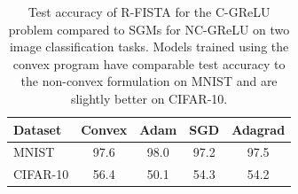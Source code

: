 \begin{table}
	\centering
	\caption{Test accuracy of R-FISTA for the C-GReLU problem compared to SGMs for NC-GReLU on two image classification tasks.
		Models trained using the convex program have comparable test accuracy to the non-convex formulation on MNIST and are slightly better on CIFAR-10.
	}%
	\label{table:image-datasets}%
	\vspace{0.1in}
	\begin{small}
		\begin{tabular}{lcccc} \toprule
			\textbf{Dataset} & \textbf{Convex} & \textbf{Adam} & \textbf{SGD} & \textbf{Adagrad} \\ \midrule
			MNIST            & 97.6            & 98.0          & 97.2         & 97.5             \\
			CIFAR-10         & 56.4            & 50.1          & 54.3         & 54.2             \\\bottomrule
		\end{tabular}
	\end{small}
\end{table}


